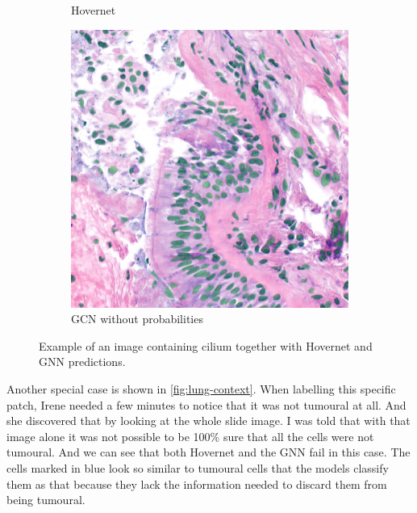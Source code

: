 \begin{figure}[H]
\begin{subfigure}[b]{0.3\textwidth}
    \caption{Hovernet}
  \end{subfigure}
  \begin{subfigure}[b]{0.3\textwidth}
    \includegraphics[width=\textwidth]{imgs/qual/lung/cilio-no-prior.png}
    \caption{GCN without probabilities}
  \end{subfigure}
    \caption{Example of an image containing cilium together with Hovernet and GNN predictions.}
    \label{fig:lung-cilium}
\end{figure}

Another special case is shown in \autoref{fig:lung-context}. When labelling this specific patch, Irene needed a few minutes to notice that it was not tumoural at all. And she discovered that by looking at the whole slide image. I was told that with that image alone it was not possible to be 100\% sure that all the cells were not tumoural. And we can see that both Hovernet and the GNN fail in this case. The cells marked in blue look so similar to tumoural cells that the models classify them as that because they lack the information needed to discard them from being tumoural.

